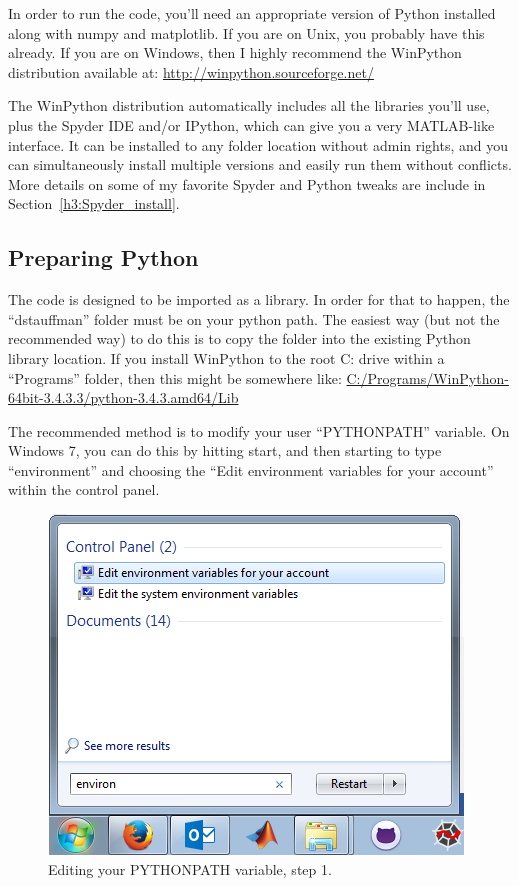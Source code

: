 \documentclass[12pt]{article}
\begin{document}
In order to run the code, you'll need an appropriate version of Python installed along with numpy and matplotlib.  If you are on Unix, you probably have this already.  If you are on Windows, then I highly recommend the WinPython distribution available at:
\newline\url{http://winpython.sourceforge.net/}

The WinPython distribution automatically includes all the libraries you'll use, plus the Spyder IDE and/or IPython, which can give you a very MATLAB-like interface.  It can be installed to any folder location without admin rights, and you can simultaneously install multiple versions and easily run them without conflicts.  More details on some of my favorite Spyder and Python tweaks are include in Section~\ref{h3:Spyder_install}.

\subsection{Preparing Python}\label{h2:Preparing_python}
The code is designed to be imported as a library.  In order for that to happen, the ``dstauffman'' folder must be on your python path.  The easiest way (but not the recommended way) to do this is to copy the folder into the existing Python library location.  If you install WinPython to the root C: drive within a ``Programs'' folder, then this might be somewhere like:
\newline\url{C:/Programs/WinPython-64bit-3.4.3.3/python-3.4.3.amd64/Lib}

The recommended method is to modify your user ``PYTHONPATH'' variable.  On Windows 7, you can do this by hitting start, and then starting to type ``environment'' and choosing the ``Edit environment variables for your account'' within the control panel.

\begin{figure}[H]
    \centering
    \includegraphics[width=.6\textwidth]{Environment_Variables1.png}
    \caption{Editing your PYTHONPATH variable, step 1.}
    \label{fig:environment1}
\end{figure}
\end{document}
